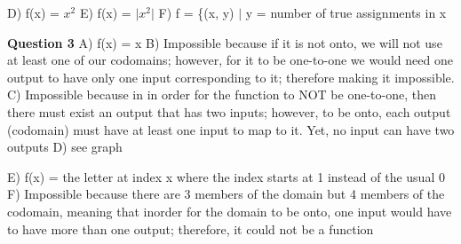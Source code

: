 \documentclass{article}
\begin{document}
\newline\newline
D) f(x) = ${x^2}$\newline
E) f(x) = $\mid$${x^2}$$\mid$\newline
F) f = \{(x, y) $\mid$ y = number of true assignments in x\newline\newline


\textbf{Question 3}\newline
A) f(x) = x\newline
B) Impossible because if it is not onto, we will not use at least one of our codomains; however, for it to be one-to-one we would need one output to have only one input corresponding to it; therefore making it impossible.\newline
C) Impossible because in in order for the function to NOT be one-to-one, then there must exist an output that has two inputs; however, to be onto, each output (codomain) must have at least one input to map to it. Yet, no input can have two outputs\newline
D) see graph\newline
{}
\newline\newline
E) f(x) = the letter at index x where the index starts at 1 instead of the usual 0\newline
F) Impossible because there are 3 members of the domain but 4 members of the codomain, meaning that inorder for the domain to be onto, one input would have to have more than one output; therefore, it could not be a function\newline
\end{document}
